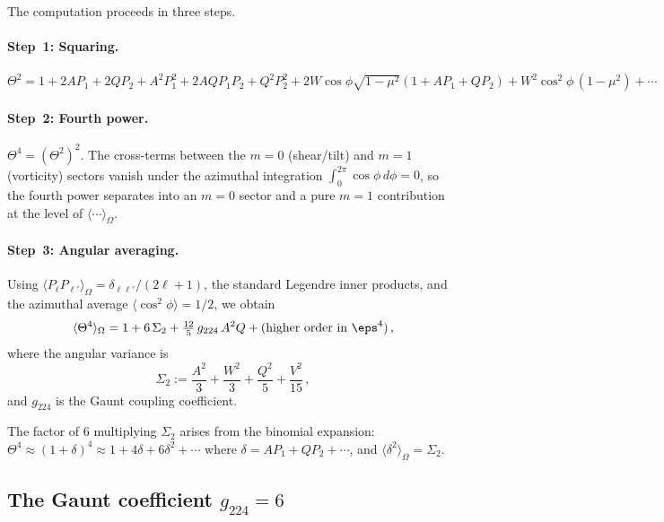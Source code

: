 The computation proceeds in three steps.

\paragraph{Step~1: Squaring.}
$\Theta^2 = 1 + 2A P_1 + 2Q P_2 + A^2 P_1^2 + 2AQ P_1 P_2
+ Q^2 P_2^2 + 2W\cos\phi\sqrt{1-\mu^2}(1 + AP_1 + QP_2)
+ W^2\cos^2\!\phi\,(1-\mu^2) + \cdots$

\paragraph{Step~2: Fourth power.}
$\Theta^4 = (\Theta^2)^2$.  The cross-terms between the
$m = 0$ (shear/tilt) and $m = 1$ (vorticity) sectors vanish
under the azimuthal integration
$\int_0^{2\pi}\cos\phi\,d\phi = 0$, so the fourth power
separates into an $m = 0$ sector and a pure $m = 1$ contribution
at the level of $\langle\cdots\rangle_\Omega$.

\paragraph{Step~3: Angular averaging.}
Using $\langle P_\ell P_{\ell'}\rangle_\Omega
= \delta_{\ell\ell'}/(2\ell+1)$, the standard Legendre
inner products, and the azimuthal average
$\langle\cos^2\!\phi\rangle = 1/2$, we obtain
\begin{equation}\label{eq:F4-full}
\langle\Theta^4\rangle_\Omega
= 1 + 6\,\Sigma_2 + \tfrac{12}{5}\,g_{224}\,A^2 Q
  + \text{(higher order in $\eps^4$)}\,,
\end{equation}
where the angular variance is
\begin{equation}\label{eq:Sigma2-def}
\Sigma_2 := \frac{A^2}{3} + \frac{W^2}{3}
  + \frac{Q^2}{5} + \frac{V^2}{15}\,,
\end{equation}
and $g_{224}$ is the Gaunt coupling coefficient.

The factor of $6$ multiplying $\Sigma_2$ arises from the
binomial expansion: $\Theta^4 \approx (1 + \delta)^4
\approx 1 + 4\delta + 6\delta^2 + \cdots$ where
$\delta = AP_1 + QP_2 + \cdots$, and
$\langle\delta^2\rangle_\Omega = \Sigma_2$.


\subsection{The Gaunt coefficient $g_{224} = 6$}
\label{sec:gaunt}

